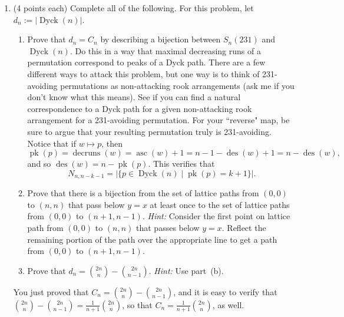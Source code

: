 \documentclass[11pt]{article}
\theoremstyle{definition}
\DeclareMathOperator{\des}{des}
\DeclareMathOperator{\asc}{asc}
\DeclareMathOperator{\decruns}{decruns}
\DeclareMathOperator{\pk}{pk}
\DeclareMathOperator{\Dyck}{Dyck}
\begin{document}
\newpage

\begin{enumerate}

	
\item (4 points each) Complete all of the following. For this problem, let $d_n:=|\Dyck(n)|$.
\begin{enumerate}

\item Prove that $d_n=C_n$ by describing a bijection between $S_n(231)$ and $\Dyck(n)$. Do this in a way that maximal decreasing runs of a permutation correspond to peaks of a Dyck path. There are a few different ways to attack this problem, but one way is to think of 231-avoiding permutations as non-attacking rook arrangements (ask me if you don't know what this means).  See if you can find a natural correspondence to a Dyck path for a given non-attacking rook arrangement for a 231-avoiding permutation. For your ``reverse" map, be sure to argue that your resulting permutation truly is 231-avoiding.  Notice that if $w\mapsto p$, then 
\[
\pk(p)=\decruns(w)=\asc(w)+1=n-1-\des(w)+1=n-\des(w),
\]
and so $\des(w)=n-\pk(p)$. This verifies that
\[
N_{n,n-k-1}=|\{p\in\Dyck(n)\mid \pk(p)=k+1\}|.
\]
\item Prove that there is a bijection from the set of lattice paths from $(0,0)$ to $(n,n)$ that pass below $y=x$ at least once to the set of lattice paths from $(0,0)$ to $(n+1,n-1)$.  \emph{Hint:} Consider the first point on lattice path from $(0,0)$ to $(n,n)$ that passes below $y=x$. Reflect the remaining portion of the path over the appropriate line to get a path from $(0,0)$ to $(n+1,n-1)$.
\item Prove that $\displaystyle d_n=\binom{2n}{n}-\binom{2n}{n-1}$. \emph{Hint:} Use part~(b). %

\end{enumerate}
You just proved that $C_n=\displaystyle \binom{2n}{n}-\binom{2n}{n-1}$, and it is easy to verify that $\displaystyle \binom{2n}{n}-\binom{2n}{n-1} = \frac{1}{n+1}\binom{2n}{n}$, so that $C_n=\displaystyle\frac{1}{n+1}\binom{2n}{n}$, as well.
	

\end{enumerate}
\end{document}

